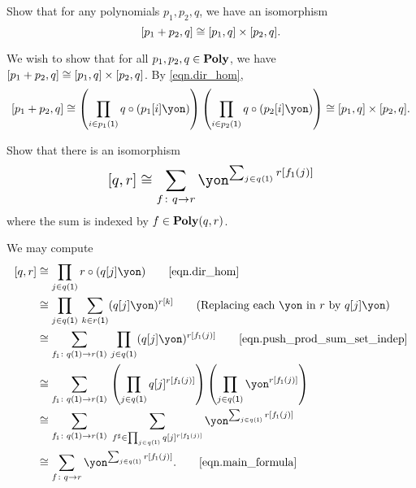 \documentclass[Book-Poly]{subfiles}
\begin{document}
\begin{exercise}\label{exc.sum_times_closure}
Show that for any polynomials $p_1,p_2,q$, we have an isomorphism
\[
[p_1 + p_2, q] \cong [p_1, q] \times [p_2, q].
\]
\begin{solution}
We wish to show that for all $p_1, p_2, q \in \mathbf{Poly}$, we have $[p_1 + p_2, q] \cong [p_1, q] \times [p_2, q]$.
By \eqref{eqn.dir_hom},
\[
    \ihom{p_1 + p_2, q} \iso \left(\prod_{i \in p_1(\1)} q \circ (p_1[i]\yon)\right) \left(\prod_{i \in p_2(\1)} q \circ (p_2[i]\yon)\right) \iso \ihom{p_1, q} \times \ihom{p_2, q}.
\]
\end{solution}
\end{exercise}

\begin{exercise} \label{exc.dir_hom_sum}
Show that there is an isomorphism
\begin{equation} \label{eqn.dir_hom_sum}
\scalebox{1.3}{$\displaystyle
\ihom{q,r} \iso \sum_{f\colon q\to r}\yon^{\sum_{j\in q(\1)}r[f_\1(j)]}
$}
\end{equation}
where the sum is indexed by $f\in\mathbf{Poly}(q,r)$.
\begin{solution}
We may compute
\begin{align*}
    \ihom{q, r} &\iso \prod_{j \in q(\1)} r \circ (q[j]\yon) \tag*{\eqref{eqn.dir_hom}} \\
    &\iso \prod_{j \in q(\1)} \, \sum_{k \in r(\1)} (q[j]\yon)^{r[k]} \tag{Replacing each $\yon$ in $r$ by $q[j]\yon$} \\
    &\iso \sum_{f_\1 \colon q(\1) \to r(\1)} \, \prod_{j \in q(\1)} (q[j]\yon)^{r[f_\1(j)]} \tag*{\eqref{eqn.push_prod_sum_set_indep}} \\
    &\iso \sum_{f_\1 \colon q(\1) \to r(\1)} \, \left(\prod_{j \in q(\1)} q[j]^{r[f_\1(j)]} \right)\left(\prod_{j \in q(\1)} \yon^{r[f_\1(j)]} \right) \\
    &\iso \sum_{f_\1 \colon q(\1) \to r(\1)} \; \sum_{f^\sharp \in \prod_{j \in q(\1)} q[j]^{r[f_\1(j)]}} \yon^{\sum_{j \in q(\1)} r[f_\1(j)]} \\
    &\iso \sum_{f \colon q \to r} \yon^{\sum_{j \in q(\1)} r[f_\1(j)]}. \tag*{\eqref{eqn.main_formula}}
\end{align*}
\end{solution}
\end{exercise}
\end{document}
